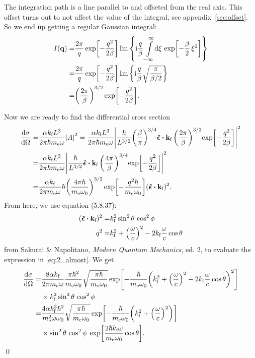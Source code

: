 \documentclass[11pt,letter, swedish, english
]{article}
\begin{document}
The integration path is a line parallel to and offseted from the real
axis. This offset turns out to not affect the value of the
integral, see appendix~\ref{sec:offset}. So we end up getting a
regular Gaussian integral:
\begin{equation}
\begin{aligned}
I(\vq)=&\frac{2\pi}{q}\exp[-\frac{q^2}{2\beta}]
\Im\qty{\ii\frac{q}{\beta}
\int_{-\infty}^{\infty}\!\rd{\xi}\,
\exp[-\frac{\beta}{2}\,\xi^2]}\\
=&\frac{2\pi}{q}\exp[-\frac{q^2}{2\beta}]
\Im\qty{\ii\frac{q}{\beta}
\sqrt{\frac{\pi}{\beta/2}}}\\
=&\qty(\frac{2\pi}{\beta})^{3/2}\exp[-\frac{q^2}{2\beta}].
\end{aligned}
\end{equation}

Now we are ready to find the differential cross section
\begin{equation}\label{eq:2_almost}
\begin{aligned}
\dv{\sigma}{\Omega}=&\frac{\alpha \kf L^3}{2\pi\hbar m_\ee\omega}
\abs{A}^2=\frac{\alpha \kf L^3}{2\pi\hbar m_\ee\omega}
\abs{\frac{\hbar}{L^{3/2}} \qty(\frac{\beta}{\pi})^{3/4}
\vu*{\epsilon}\vdot\vkf\,
\qty(\frac{2\pi}{\beta})^{3/2}\!\exp[-\frac{q^2}{2\beta}]}^2\\
=&\frac{\alpha \kf L^3}{2\pi\hbar m_\ee\omega}
\abs{\frac{\hbar}{L^{3/2}} 
\vu*{\epsilon}\vdot\vkf\,
\qty(\frac{4\pi}{\beta})^{3/4}\!\exp[-\frac{q^2}{2\beta}]}^2\\
=&\frac{\alpha\kf}{2\pi m_\ee\omega}
\hbar\qty(\frac{4\pi\hbar}{m_\ee\omega_0})^{3/2}
\exp[-\frac{q^2\hbar}{m_\ee\omega_0}](\vu*{\epsilon}\vdot\vkf)^2.
\end{aligned}
\end{equation}
From here, we use equation (5.8.37):
\begin{equation}
\begin{aligned}
(\vu*{\epsilon}\vdot\vkf)^2=&\kf^2\sin^2\theta\,\cos^2\phi\\
q^2=&\kf^2+\qty(\frac{\omega}{c})^2-2\kf\frac{\omega}{c}\cos\theta
\end{aligned}
\end{equation}
from Sakurai \& Napolitano, \textit{Modern Quantum Mechanics}, ed. 2,
to evaluate the expression in \eqref{eq:2_almost}. We get
\begin{equation}
\begin{aligned}
\dv{\sigma}{\Omega}=&\frac{8\alpha k_{\text{f}}}{2\pi m_{\mathrm{e}}\omega}
\frac{\pi\hbar^2}{m_{\mathrm{e}}\omega_0}
\sqrt{\frac{\pi\hbar}{m_{\mathrm{e}}\omega_0}}
\exp[-\frac{\hbar}{m_{\mathrm{e}}\omega_0}
\qty(k_{\text{f}}^2+\qty(\frac{\omega}{c})^2-2k_{\text{f}}\frac{\omega}{c}\cos\theta)^2]\\
&\times k_{\text{f}}^2\sin^2\theta\,\cos^2\phi\\
=&\frac{4\alpha k_{\text{f}}^3\hbar^2}{m_{\mathrm{e}}^2\omega\omega_0}
\sqrt{\frac{\pi\hbar}{m_{\mathrm{e}}\omega_0}}
\exp[-\frac{\hbar}{m_{\mathrm{e}}\omega_0}
\qty(k_{\text{f}}^2+\qty(\frac{\omega}{c})^2)]\\
&\times\sin^2\theta\,\cos^2\phi\;
\exp[\frac{2\hbar k_{\text{f}}\omega}{m_{\mathrm{e}}\omega_0}\cos\theta].
\end{aligned}
\end{equation}
\qed
\end{document}
